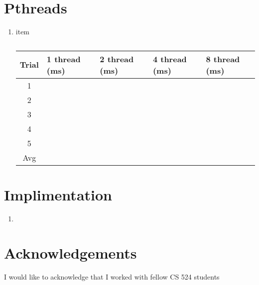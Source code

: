 \documentclass[a4paper,12pt]{article}
\theoremstyle{definition}
\theoremstyle{remark}
\begin{document}
		\section{Pthreads}
		\begin{enumerate}
			\item 
			item \begin{table}[h]
				\centering
				\begin{tabular}{|c|l|l|l|l|}
					\hline
					\textbf{Trial}& \textbf{1 thread (ms)}  &\textbf{2 thread (ms)}  &\textbf{4  thread (ms)}  &\textbf{8 thread (ms)}  \\
					\hline\hline
					1&  &  &  &  \\
					2&  &  &  &  \\
					3&  &  &  &  \\
					4&  &  &  &  \\
					5&  &  &  &  \\
					\hline
					Avg&  &  &  &  \\
					\hline
				\end{tabular}
				\label{tab:Ptheads}
				\caption{}
			\end{table}
		\end{enumerate}
		\section{Implimentation}
		\begin{enumerate}
			\item 
		\end{enumerate}
		
		
	
	\section*{Acknowledgements}
	I would like to acknowledge that I worked with fellow CS 524 students 
	
\end{document}
